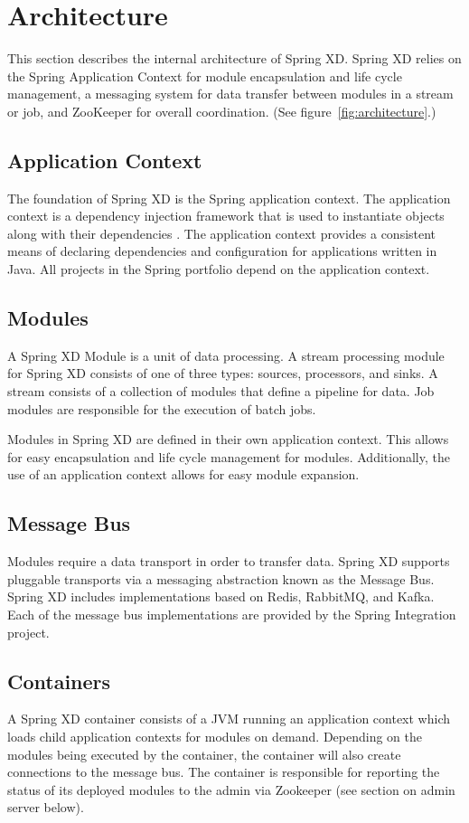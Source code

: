 \section{Architecture}
This section describes the internal architecture of Spring XD. Spring XD
relies on the Spring Application Context for module encapsulation and
life cycle management, a messaging system for data
transfer between modules in a stream or job, and ZooKeeper for overall
coordination. (See figure~\ref{fig:architecture}.)

\subsection{Application Context}
The foundation of Spring XD is the Spring application context. The application
context is a dependency injection framework that is used to instantiate
objects along with their dependencies \cite{spring-framework-reference}.
The application context provides a consistent means of declaring dependencies
and configuration for applications written in Java. All projects in the
Spring portfolio depend on the application context.

\subsection{Modules}
A Spring XD Module is a unit of data processing. A stream processing module
for Spring XD consists of one of three types: sources, processors, and sinks.
A stream consists of a collection of modules that define a pipeline for data. 
Job modules are responsible for the execution of batch jobs.

Modules in Spring XD are defined in their own application context. This allows
for easy encapsulation and life cycle management for modules. Additionally,
the use of an application context allows for easy module expansion.

\subsection{Message Bus}
Modules require a data transport in order to transfer data. Spring XD
supports pluggable transports via a messaging abstraction known as 
the Message Bus. Spring XD includes implementations based on Redis, RabbitMQ,
and Kafka. Each of the message bus implementations are provided by the
Spring Integration project.

\subsection{Containers}
A Spring XD container consists of a JVM running an application context which
loads child application contexts for modules on demand. Depending on the modules
being executed by the container, the container will also create connections to
the message bus. The container is responsible for reporting the status of its deployed
modules to the admin via Zookeeper (see section on admin server below).

